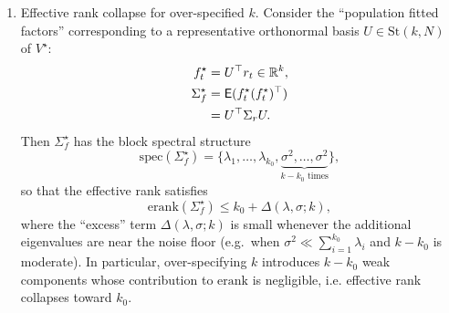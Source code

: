 \documentclass[twoside,11pt,letter]{article}
\begin{document}
\begin{theorem}
\begin{enumerate}[label=(\roman*)]
\item {\rm Effective rank collapse for over-specified $k$.} Consider the ``population fitted factors'' corresponding to a representative orthonormal basis
$U\in \mathrm{St}(k,N)$ of $V^\star$:
\begin{equation}\label{eq:pop-factors}
\begin{split}
f_t^\star&= U^\top r_t \in \mathbb{R}^k,\\
\Sigma^\star_f &= \mathsf{E}(f_t^\star (f_t^\star)^\top )\\
&= U^\top \Sigma_r U.
\end{split}
\end{equation}
Then $\Sigma_f^\star$ has the block spectral structure
\begin{equation*}
\mathrm{spec}(\Sigma_f^\star)=\{\lambda_1,\ldots,\lambda_{k_0},\underbrace{\sigma^2,\ldots,\sigma^2}_{k-k_0\text{ times}}\},
\end{equation*}
so that the effective rank satisfies
\begin{equation}\label{eq:erank-collapse}
\mathrm{erank}(\Sigma_f^\star)\leq k_0 + \Delta(\lambda,\sigma;k),
\end{equation}
where the ``excess'' term $\Delta(\lambda,\sigma;k)$ is small whenever the additional eigenvalues are near the noise floor (e.g.\ when $\sigma^2 \ll \sum_{i=1}^{k_0}\lambda_i$ and $k-k_0$ is moderate). In particular, over-specifying $k$ introduces $k-k_0$ weak components whose contribution to
$\mathrm{erank}$ is negligible, i.e. effective rank collapses toward $k_0$.
\end{enumerate}
\end{theorem}
\end{document}
